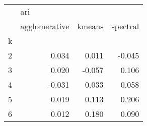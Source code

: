 \begin{tabular}{lrrr}
\toprule
{} & \multicolumn{3}{l}{ari} \\
{} & agglomerative & kmeans & spectral \\
k &               &        &          \\
\midrule
2 &         0.034 &  0.011 &   -0.045 \\
3 &         0.020 & -0.057 &    0.106 \\
4 &        -0.031 &  0.033 &    0.058 \\
5 &         0.019 &  0.113 &    0.206 \\
6 &         0.012 &  0.180 &    0.090 \\
\bottomrule
\end{tabular}
